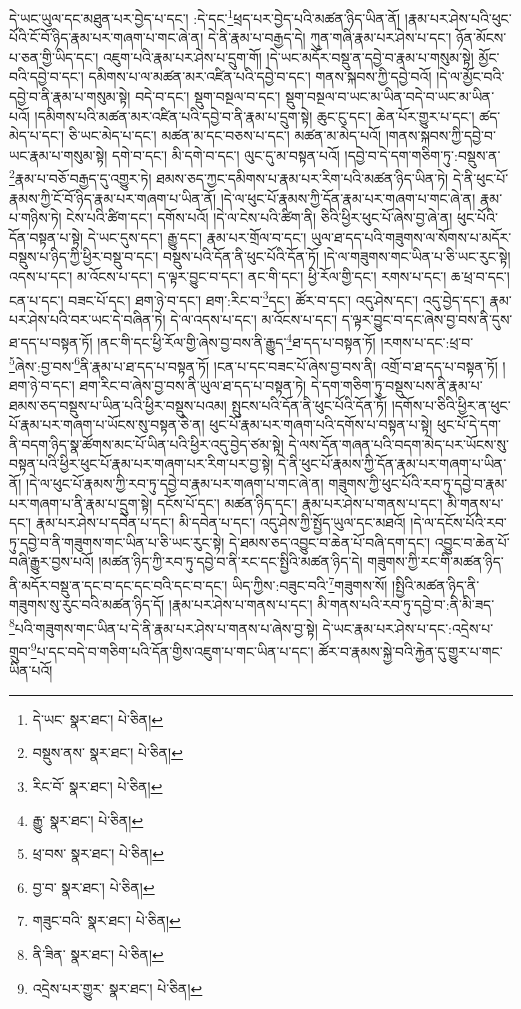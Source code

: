 དེ་ཡང་ཡུལ་དང་མཐུན་པར་བྱེད་པ་དང་། :དེ་དང་\footnote{དེ་ཡང་  སྣར་ཐང་།  པེ་ཅིན། }ཕྲད་པར་བྱེད་པའི་མཚན་ཉིད་ཡིན་ནོ། །རྣམ་པར་ཤེས་པའི་ཕུང་པོའི་ངོ་བོ་ཉིད་རྣམ་པར་གཞག་པ་གང་ཞེ་ན། དེ་ནི་རྣམ་པ་བརྒྱད་དེ། ཀུན་གཞི་རྣམ་པར་ཤེས་པ་དང་། ཉོན་མོངས་པ་ཅན་གྱི་ཡིད་དང་། འཇུག་པའི་རྣམ་པར་ཤེས་པ་དྲུག་གོ། །དེ་ཡང་མདོར་བསྡུ་ན་དབྱེ་བ་རྣམ་པ་གསུམ་སྟེ། མྱོང་བའི་དབྱེ་བ་དང་། དམིགས་པ་ལ་མཚན་མར་འཛིན་པའི་དབྱེ་བ་དང་། གནས་སྐབས་ཀྱི་དབྱེ་བའོ། །དེ་ལ་མྱོང་བའི་དབྱེ་བ་ནི་རྣམ་པ་གསུམ་སྟེ། བདེ་བ་དང་། སྡུག་བསྔལ་བ་དང་། སྡུག་བསྔལ་བ་ཡང་མ་ཡིན་བདེ་བ་ཡང་མ་ཡིན་པའོ། །དམིགས་པའི་མཚན་མར་འཛིན་པའི་དབྱེ་བ་ནི་རྣམ་པ་དྲུག་སྟེ། ཆུང་ངུ་དང་། ཆེན་པོར་གྱུར་པ་དང་། ཚད་མེད་པ་དང་། ཅི་ཡང་མེད་པ་དང་། མཚན་མ་དང་བཅས་པ་དང་། མཚན་མ་མེད་པའོ། །གནས་སྐབས་ཀྱི་དབྱེ་བ་ཡང་རྣམ་པ་གསུམ་སྟེ། དགེ་བ་དང་། མི་དགེ་བ་དང་། ལུང་དུ་མ་བསྟན་པའོ། །དབྱེ་བ་དེ་དག་གཅིག་ཏུ་:བསྡུས་ན་\footnote{བསྡུས་ནས་  སྣར་ཐང་།  པེ་ཅིན། }རྣམ་པ་བཅོ་བརྒྱད་དུ་འགྱུར་ཏེ། ཐམས་ཅད་ཀྱང་དམིགས་པ་རྣམ་པར་རིག་པའི་མཚན་ཉིད་ཡིན་ཏེ། དེ་ནི་ཕུང་པོ་རྣམས་ཀྱི་ངོ་བོ་ཉིད་རྣམ་པར་གཞག་པ་ཡིན་ནོ། །དེ་ལ་ཕུང་པོ་རྣམས་ཀྱི་དོན་རྣམ་པར་གཞག་པ་གང་ཞེ་ན། རྣམ་པ་གཉིས་ཏེ། ངེས་པའི་ཚིག་དང་། དགོས་པའོ། །དེ་ལ་ངེས་པའི་ཚིག་ནི། ཅིའི་ཕྱིར་ཕུང་པོ་ཞེས་བྱ་ཞེ་ན། ཕུང་པོའི་དོན་བསྟན་པ་སྟེ། དེ་ཡང་དུས་དང་། རྒྱུ་དང་། རྣམ་པར་གྲོལ་བ་དང་། ཡུལ་ཐ་དད་པའི་གཟུགས་ལ་སོགས་པ་མདོར་བསྡུས་པ་ཉིད་ཀྱི་ཕྱིར་བསྡུ་བ་དང་། བསྡུས་པའི་དོན་ནི་ཕུང་པོའི་དོན་ཏོ། །དེ་ལ་གཟུགས་གང་ཡིན་པ་ཅི་ཡང་རུང་སྟེ། འདས་པ་དང་། མ་འོངས་པ་དང་། ད་ལྟར་བྱུང་བ་དང་། ནང་གི་དང་། ཕྱི་རོལ་གྱི་དང་། རགས་པ་དང་། ཆ་ཕྲ་བ་དང་། ངན་པ་དང་། བཟང་པོ་དང་། ཐག་ཉེ་བ་དང་། ཐག་:རིང་བ་\footnote{རིང་བོ་  སྣར་ཐང་།  པེ་ཅིན། }དང་། ཚོར་བ་དང་། འདུ་ཤེས་དང་། འདུ་བྱེད་དང་། རྣམ་པར་ཤེས་པའི་བར་ཡང་དེ་བཞིན་ཏེ། དེ་ལ་འདས་པ་དང་། མ་འོངས་པ་དང་། ད་ལྟར་བྱུང་བ་དང་ཞེས་བྱ་བས་ནི་དུས་ཐ་དད་པ་བསྟན་ཏོ། །ནང་གི་དང་ཕྱི་རོལ་གྱི་ཞེས་བྱ་བས་ནི་རྒྱུད་\footnote{རྒྱུ་  སྣར་ཐང་།  པེ་ཅིན། }ཐ་དད་པ་བསྟན་ཏོ། །རགས་པ་དང་:ཕྲ་བ་\footnote{ཕྲ་བས་  སྣར་ཐང་།  པེ་ཅིན། }ཞེས་:བྱ་བས་\footnote{བྱ་བ་  སྣར་ཐང་།  པེ་ཅིན། }ནི་རྣམ་པ་ཐ་དད་པ་བསྟན་ཏོ། །ངན་པ་དང་བཟང་པོ་ཞེས་བྱ་བས་ནི། འགྲོ་བ་ཐ་དད་པ་བསྟན་ཏོ། །ཐག་ཉེ་བ་དང་། ཐག་རིང་བ་ཞེས་བྱ་བས་ནི་ཡུལ་ཐ་དད་པ་བསྟན་ཏེ། དེ་དག་གཅིག་ཏུ་བསྡུས་པས་ནི་རྣམ་པ་ཐམས་ཅད་བསྡུས་པ་ཡིན་པའི་ཕྱིར་བསྡུས་པའམ། སྤུངས་པའི་དོན་ནི་ཕུང་པོའི་དོན་ཏོ། །དགོས་པ་ཅིའི་ཕྱིར་ན་ཕུང་པོ་རྣམ་པར་གཞག་པ་ཡོངས་སུ་བསྟན་ཅེ་ན། ཕུང་པོ་རྣམ་པར་གཞག་པའི་དགོས་པ་བསྟན་པ་སྟེ། ཕུང་པོ་དེ་དག་ནི་བདག་ཉིད་སྣ་ཚོགས་མང་པོ་ཡིན་པའི་ཕྱིར་འདུ་བྱེད་ཙམ་སྟེ། དེ་ལས་དོན་གཞན་པའི་བདག་མེད་པར་ཡོངས་སུ་བསྟན་པའི་ཕྱིར་ཕུང་པོ་རྣམ་པར་གཞག་པར་རིག་པར་བྱ་སྟེ། དེ་ནི་ཕུང་པོ་རྣམས་ཀྱི་དོན་རྣམ་པར་གཞག་པ་ཡིན་ནོ། །དེ་ལ་ཕུང་པོ་རྣམས་ཀྱི་རབ་ཏུ་དབྱེ་བ་རྣམ་པར་གཞག་པ་གང་ཞེ་ན། གཟུགས་ཀྱི་ཕུང་པོའི་རབ་ཏུ་དབྱེ་བ་རྣམ་པར་གཞག་པ་ནི་རྣམ་པ་དྲུག་སྟེ། དངོས་པོ་དང་། མཚན་ཉིད་དང་། རྣམ་པར་ཤེས་པ་གནས་པ་དང་། མི་གནས་པ་དང་། རྣམ་པར་ཤེས་པ་དབེན་པ་དང་། མི་དབེན་པ་དང་། འདུ་ཤེས་ཀྱི་སྤྱོད་ཡུལ་དང་མཐའོ། །དེ་ལ་དངོས་པོའི་རབ་ཏུ་དབྱེ་བ་ནི་གཟུགས་གང་ཡིན་པ་ཅི་ཡང་རུང་སྟེ། དེ་ཐམས་ཅད་འབྱུང་བ་ཆེན་པོ་བཞི་དག་དང་། འབྱུང་བ་ཆེན་པོ་བཞི་རྒྱུར་བྱས་པའོ། །མཚན་ཉིད་ཀྱི་རབ་ཏུ་དབྱེ་བ་ནི་རང་དང་སྤྱིའི་མཚན་ཉིད་དེ། གཟུགས་ཀྱི་རང་གི་མཚན་ཉིད་ནི་མདོར་བསྡུ་ན་དང་བ་དང་དང་བའི་དང་བ་དང་། ཡིད་ཀྱིས་:བཟུང་བའི་\footnote{གཟུང་བའི་  སྣར་ཐང་།  པེ་ཅིན། }གཟུགས་སོ། །སྤྱིའི་མཚན་ཉིད་ནི་གཟུགས་སུ་རུང་བའི་མཚན་ཉིད་དོ། །རྣམ་པར་ཤེས་པ་གནས་པ་དང་། མི་གནས་པའི་རབ་ཏུ་དབྱེ་བ་:ནི་མི་ཟད་\footnote{ནི་ཟིན་  སྣར་ཐང་།  པེ་ཅིན། }པའི་གཟུགས་གང་ཡིན་པ་དེ་ནི་རྣམ་པར་ཤེས་པ་གནས་པ་ཞེས་བྱ་སྟེ། དེ་ཡང་རྣམ་པར་ཤེས་པ་དང་:འདྲེས་པ་གྲུབ་\footnote{འདྲེས་པར་གྱུར་  སྣར་ཐང་།  པེ་ཅིན། }པ་དང་བདེ་བ་གཅིག་པའི་དོན་གྱིས་འཇུག་པ་གང་ཡིན་པ་དང་། ཚོར་བ་རྣམས་སྐྱེ་བའི་རྐྱེན་དུ་གྱུར་པ་གང་ཡིན་པའོ། 